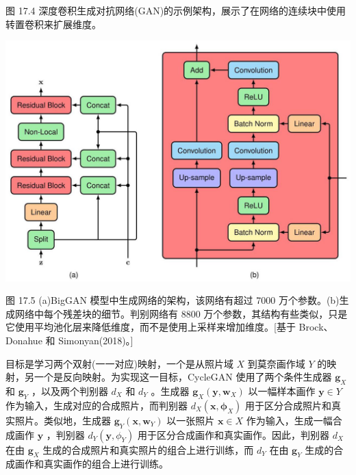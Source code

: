 \documentclass[10pt]{report}
\begin{document}
图 17.4 深度卷积生成对抗网络(GAN)的示例架构，展示了在网络的连续块中使用转置卷积来扩展维度。

\begin{center}
\includegraphics[max width=1.0\textwidth]{images/0194e279-9b28-703a-88f4-c3ac21e2010d_559_226_346_1280_893_0.jpg}
\end{center}
\hspace*{3em} 

图 17.5 (a)BigGAN 模型中生成网络的架构，该网络有超过 7000 万个参数。(b)生成网络中每个残差块的细节。判别网络有 8800 万个参数，其结构有些类似，只是它使用平均池化层来降低维度，而不是使用上采样来增加维度。[基于 Brock、Donahue 和 Simonyan(2018)。]

目标是学习两个双射(一一对应)映射，一个是从照片域 \(X\) 到莫奈画作域 \(Y\) 的映射，另一个是反向映射。为实现这一目标，CycleGAN 使用了两个条件生成器 \({\mathbf{g}}_{X}\) 和 \({\mathbf{g}}_{Y}\) ，以及两个判别器 \({d}_{X}\) 和 \({d}_{Y}\) 。生成器 \({\mathbf{g}}_{X}\left( {\mathbf{y},{\mathbf{w}}_{X}}\right)\) 以一幅样本画作 \(\mathbf{y} \in  Y\) 作为输入，生成对应的合成照片，而判别器 \({d}_{X}\left( {\mathbf{x},{\mathbf{\phi }}_{X}}\right)\) 用于区分合成照片和真实照片。类似地，生成器 \({\mathbf{g}}_{Y}\left( {\mathbf{x},{\mathbf{w}}_{Y}}\right)\) 以一张照片 \(\mathbf{x} \in  X\) 作为输入，生成一幅合成画作 \(\mathbf{y}\) ，判别器 \({d}_{Y}\left( {\mathbf{y},{\phi }_{Y}}\right)\) 用于区分合成画作和真实画作。因此，判别器 \({d}_{X}\) 在由 \({\mathbf{g}}_{X}\) 生成的合成照片和真实照片的组合上进行训练，而 \({d}_{Y}\) 在由 \({\mathbf{g}}_{Y}\) 生成的合成画作和真实画作的组合上进行训练。
\end{document}
